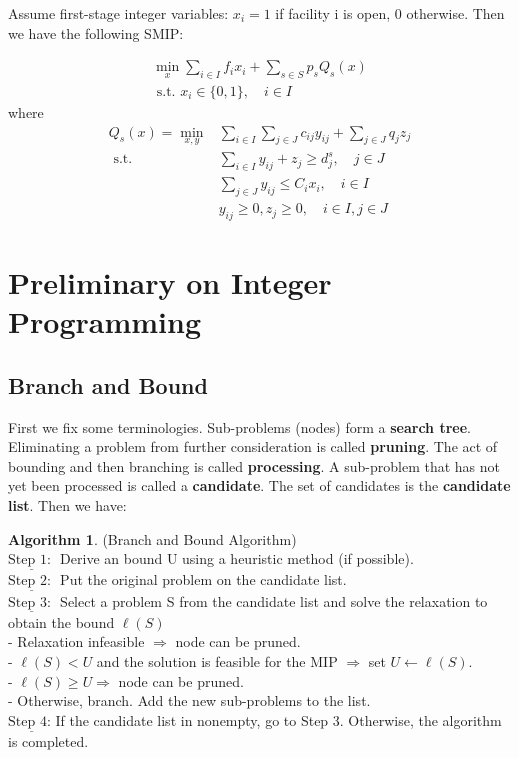 \documentclass{article}
\theoremstyle{plain}
\theoremstyle{definition}
\newtheorem{algorithm}[theorem]{Algorithm}
\begin{document}
Assume first-stage integer variables:  $x_{i}=1$  if facility  i  is open, 0 otherwise. Then we have the following SMIP:

\begin{equation}
\begin{array}{l}
\min _{x} \sum_{i \in I} f_{i} x_{i}+\sum_{s \in S} p_{s} Q_{s}(x) \\
\text { s.t. } x_{i} \in\{0,1\}, \quad i \in I
\end{array}
\end{equation}
where
\begin{equation}
\begin{aligned}
Q_{s}(x)=\min _{x, y} & \sum_{i \in I} \sum_{j \in J} c_{i j} y_{i j}+\sum_{j \in J} q_{j} z_{j} \\
\text { s.t. } & \sum_{i \in I} y_{i j}+z_{j} \geq d_{j}^{s}, \quad j \in J \\
& \sum_{j \in J} y_{i j} \leq C_{i} x_{i}, \quad i \in I \\
& y_{i j} \geq 0, z_{j} \geq 0, \quad i \in I, j \in J
\end{aligned}
\end{equation}

\section{Preliminary on Integer Programming}
\subsection{Branch and Bound}
First we fix some terminologies. Sub-problems (nodes) form a \textbf{search tree}. Eliminating a problem from further consideration is called \textbf{pruning}. The act of bounding and then branching is called \textbf{processing}. A sub-problem that has not yet been processed is called a \textbf{candidate}. The set of candidates is the \textbf{candidate list}. Then we have:

\begin{algorithm}(Branch and Bound Algorithm) \\
$ \underline{\text {Step 1: }}$ Derive an bound  U  using a heuristic method (if possible). \\
$ \underline{\text {Step 2: }}$ Put the original problem on the candidate list.\\
$ \underline{\text {Step 3: }}$ Select a problem  S  from the candidate list and solve the relaxation to obtain the bound $\ell(S) $ \\
\indent - Relaxation infeasible  $\Rightarrow$  node can be pruned. \\
\indent -  $\ell(S)<U$  and the solution is feasible for the MIP  $\Rightarrow$  set  $U \leftarrow \ell(S) $.\\
\indent -  $\ell(S) \geq U \Rightarrow$  node can be pruned. \\
\indent - Otherwise, branch. Add the new sub-problems to the list.\\
$ \underline{\text {Step 4: }}$If the candidate list in nonempty, go to Step 3. Otherwise, the algorithm is completed.
\end{algorithm}
\end{document}
